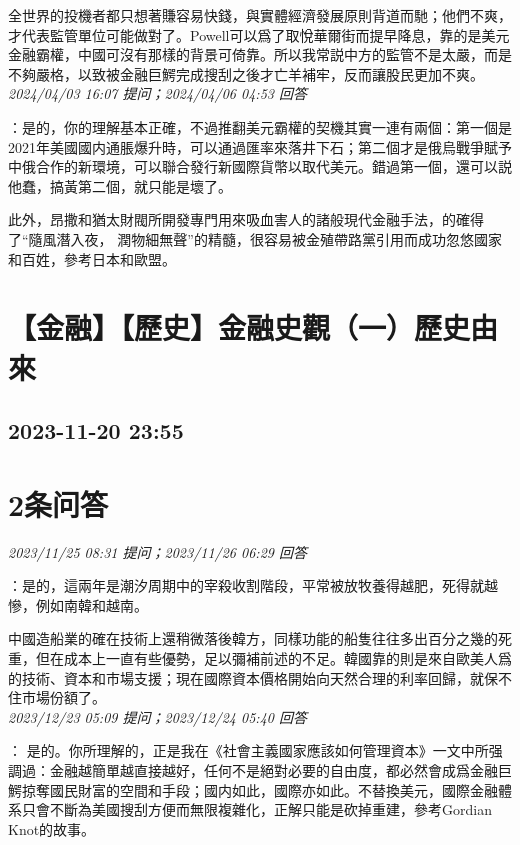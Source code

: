 \documentclass[twocolumn]{ctexart}
\begin{document}
全世界的投機者都只想著賺容易快錢，與實體經濟發展原則背道而馳；他們不爽，才代表監管單位可能做對了。Powell可以爲了取悅華爾街而提早降息，靠的是美元金融霸權，中國可沒有那樣的背景可倚靠。所以我常説中方的監管不是太嚴，而是不夠嚴格，以致被金融巨鰐完成搜刮之後才亡羊補牢，反而讓股民更加不爽。
\\

\textit{\hfill\noindent\small 2024/04/03 16:07 提问；2024/04/06 04:53 回答}

：是的，你的理解基本正確，不過推翻美元霸權的契機其實一連有兩個：第一個是2021年美國國内通脹爆升時，可以通過匯率來落井下石；第二個才是俄烏戰爭賦予中俄合作的新環境，可以聯合發行新國際貨幣以取代美元。錯過第一個，還可以説他蠢，搞黃第二個，就只能是壞了。

此外，昂撒和猶太財閥所開發專門用來吸血害人的諸般現代金融手法，的確得了“隨風潛入夜， 潤物細無聲”的精髓，很容易被金殖帶路黨引用而成功忽悠國家和百姓，參考日本和歐盟。
\\


\section{【金融】【歷史】金融史觀（一）歷史由來}
\subsection{2023-11-20 23:55}


\section{2条问答}

\textit{\hfill\noindent\small 2023/11/25 08:31 提问；2023/11/26 06:29 回答}

：是的，這兩年是潮汐周期中的宰殺收割階段，平常被放牧養得越肥，死得就越慘，例如南韓和越南。

中國造船業的確在技術上還稍微落後韓方，同樣功能的船隻往往多出百分之幾的死重，但在成本上一直有些優勢，足以彌補前述的不足。韓國靠的則是來自歐美人爲的技術、資本和市場支援；現在國際資本價格開始向天然合理的利率回歸，就保不住市場份額了。
\\

\textit{\hfill\noindent\small 2023/12/23 05:09 提问；2023/12/24 05:40 回答}

：
是的。你所理解的，正是我在《社會主義國家應該如何管理資本》一文中所强調過：金融越簡單越直接越好，任何不是絕對必要的自由度，都必然會成爲金融巨鰐掠奪國民財富的空間和手段；國内如此，國際亦如此。不替換美元，國際金融體系只會不斷為美國搜刮方便而無限複雜化，正解只能是砍掉重建，參考Gordian Knot的故事。
\\
\end{document}
